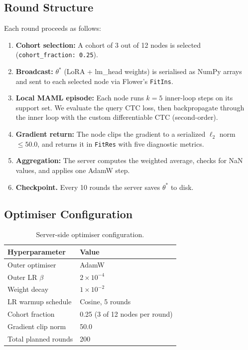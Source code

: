\documentclass[12pt]{article}
\theoremstyle{plain}
\begin{document}
\subsection{Round Structure}

Each round proceeds as follows:

\begin{enumerate}
  \item \textbf{Cohort selection:} A cohort of 3 out of 12
        nodes is selected (\verb|cohort_fraction: 0.25|).
  \item \textbf{Broadcast:} $\theta^*$ (LoRA + lm\_head weights) is serialised
        as NumPy arrays and sent to each selected node via Flower's \texttt{FitIns}.
  \item \textbf{Local MAML episode:} Each node runs $k=5$ inner-loop steps on its
        support set. We evaluate the query CTC loss, then backpropagate through the
        inner loop with the custom differentiable CTC (second-order).
  \item \textbf{Gradient return:} The node clips the gradient to a serialized $\ell_2$ norm
        $\leq 50.0$, and returns it in \texttt{FitRes} with
        five diagnostic metrics.
  \item \textbf{Aggregation:} The server computes the weighted average, checks
        for NaN values, and applies one AdamW step.
  \item \textbf{Checkpoint.} Every 10 rounds the server saves $\theta^*$ to disk.
\end{enumerate}

\subsection{Optimiser Configuration}

\begin{table}[H]
\centering
\caption{Server-side optimiser configuration.}
\label{tab:optim}
\begin{tabular}{ll}
\toprule
\textbf{Hyperparameter} & \textbf{Value} \\
\midrule
Outer optimiser     & AdamW \\
Outer LR $\beta$    & $2 \times 10^{-4}$ \\
Weight decay        & $1 \times 10^{-2}$ \\
LR warmup schedule  & Cosine, 5 rounds \\
Cohort fraction     & 0.25 (3 of 12 nodes per round) \\
Gradient clip norm  & 50.0 \\
Total planned rounds & 200 \\
\bottomrule
\end{tabular}
\end{table}
\end{document}
